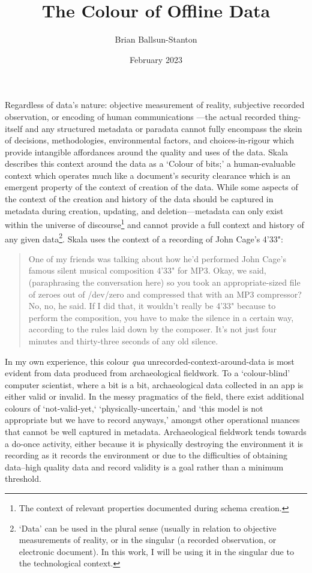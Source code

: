 \documentclass{scrarticle}
\title{The Colour of Offline Data}
\author{Brian Ballsun-Stanton}
\date{February 2023}
\begin{document}
\maketitle
{}


Regardless of data's nature: objective measurement of reality, subjective recorded observation, or encoding of human communications \parencite{Ballsun-Stanton2010-cn}---the actual recorded thing-itself and any structured metadata or paradata 
cannot fully encompass the skein of decisions, methodologies, environmental factors, and choices-in-rigour which provide intangible affordances around the quality and uses of the data. Skala describes this context around the data as a `Colour of bits;' a human-evaluable context which operates much like a document's security clearance which is an emergent property of the context of creation of the data\parencite*{Skala2004-zc}. While some aspects of the context of the creation and history of the data should be captured in metadata during creation, updating, and deletion---metadata can only exist within the universe of discourse\footnote{The context of relevant properties documented during schema creation.
} and cannot provide a full context and history of any given data\footnote{`Data' can be used in the plural sense (usually in relation to objective measurements of reality, or in the singular (a recorded observation, or electronic document). In this work, I will be using it in the singular due to the technological context.}. Skala uses the context of a recording of John Cage's 4'33":
\begin{quote}
One of my friends was talking about how he'd performed John Cage's famous silent musical composition 4'33" for MP3.  Okay, we said, (paraphrasing the conversation here) so you took an appropriate-sized file of zeroes out of /dev/zero and compressed that with an MP3 compressor?  No, no, he said.  If I did that, it wouldn't really be 4'33" because to perform the composition, you have to make the silence in a certain way, according to the rules laid down by the composer.  It's not just four minutes and thirty-three seconds of any old silence. \parencite*{Skala2004-zc}
\end{quote}

In my own experience, this colour \textit{qua} unrecorded-context-around-data is most evident from data produced from archaeological fieldwork. To a `colour-blind' computer scientist, where a bit is a bit, archaeological data collected in an app is either valid or invalid. In the messy pragmatics of the field, there exist additional colours of `not-valid-yet,` `physically-uncertain,' and `this model is not appropriate but we have to record anyways,' amongst other operational nuances that cannot be well captured in metadata. Archaeological fieldwork tends towards a do-once activity, either because it is physically destroying the environment it is recording as it records the environment or due to the difficulties of obtaining data--high quality data and record validity is a goal rather than a minimum threshold.
\end{document}
